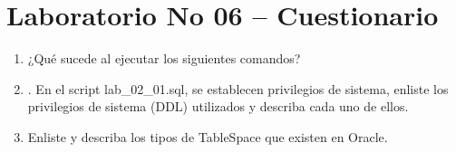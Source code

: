 \section{Laboratorio No 06 – Cuestionario} 

\begin{enumerate}[1.]
	\item ¿Qué sucede al ejecutar los siguientes comandos?
	

	\item . En el script lab\_02\_01.sql, se establecen privilegios de sistema, enliste los privilegios de sistema (DDL) utilizados y describa cada uno de ellos.
	
	\item Enliste y describa los tipos de TableSpace que existen en Oracle.
	
	

\end{enumerate} 
